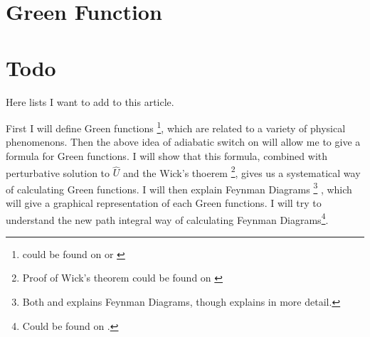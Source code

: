 \documentclass{article}
\numberwithin{equation}{subsection} %
\begin{document}
\section{Green Function}
\label{sec:Green Function}

\section{Todo}

Here lists I want to add to this article.

First I will define Green functions
\footnote{could be found on \cite{fetter} or \cite{mahan}},
which are related to a variety of physical phenomenons. Then the above idea of adiabatic switch on will allow me to give a formula for Green functions. I will show that this formula, combined with perturbative solution to $\hat{U}$ and the Wick's thoerem
\footnote{Proof of Wick's theorem could be found on \cite{fetter}},
gives us a systematical way of calculating Green functions. I will then explain Feynman Diagrams
\footnote{Both \cite{fetter} and \cite{mahan} explains Feynman Diagrams, though \cite{fetter} explains in more detail.}
, which will give a graphical representation of each Green functions. I will try to understand the new path integral way of calculating Feynman Diagrams\footnote{Could be found on \cite{Negele}.}.
\end{document}

